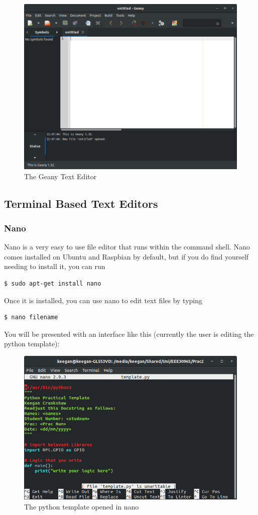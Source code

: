 \begin{figure}[H]
\centering
\includegraphics[width=0.6\columnwidth]{Figures/Geany}
\caption{The Geany Text Editor}
\label{fig:geany}
\end{figure}


\subsection{Terminal Based Text Editors}
\subsubsection{Nano}
Nano is a very easy to use file editor that runs within the command shell. Nano comes installed on Ubuntu and Raspbian by default, but if you do find yourself needing to install it, you can run
\begin{lstlisting}
$ sudo apt-get install nano
\end{lstlisting}

Once it is installed, you can use nano to edit text files by typing
\begin{lstlisting}
$ nano filename
\end{lstlisting}

You will be presented with an interface like this (currently the user is editing the python template):
\begin{figure}[H]
\centering
\includegraphics[width=0.6\columnwidth]{Figures/nanooutput}
\caption{The python template opened in nano}
\label{fig:nanooutput}
\end{figure}

